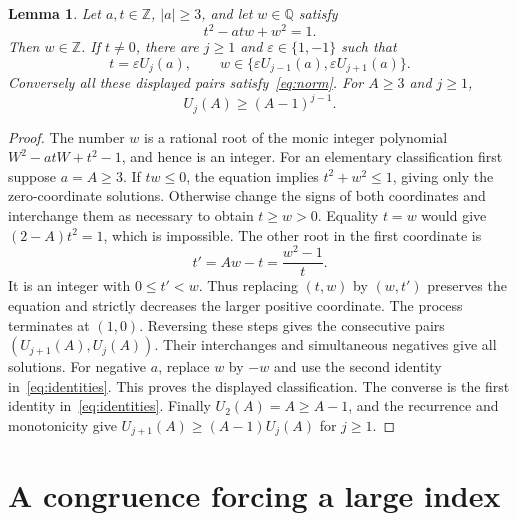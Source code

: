 \documentclass[11pt,a4paper]{article}
\newtheorem{lemma}[theorem]{Lemma}
\newcommand{\Q}{\mathbb Q}\newcommand{\Z}{\mathbb Z}
\begin{document}
\begin{lemma}\label{lem:classification}
Let $a,t\in\Z$, $|a|\ge3$, and let $w\in\Q$ satisfy
\begin{equation}\label{eq:norm}
                         t^2-atw+w^2=1.
\end{equation}
Then $w\in\Z$. If $t\ne0$, there are $j\ge1$ and
$\varepsilon\in\{1,-1\}$ such that
\[
 t=\varepsilon U_j(a),\qquad
 w\in\{\varepsilon U_{j-1}(a),\varepsilon U_{j+1}(a)\}.
\]
Conversely all these displayed pairs satisfy~\eqref{eq:norm}.
For $A\ge3$ and $j\ge1$,
\begin{equation}\label{eq:elementary-growth}
                              U_j(A)\ge(A-1)^{j-1}.
\end{equation}
\end{lemma}
\begin{proof}
The number $w$ is a rational root of the monic integer polynomial
$W^2-atW+t^2-1$, and hence is an integer. For an elementary
classification first suppose $a=A\ge3$. If $tw\le0$, the equation
implies $t^2+w^2\le1$, giving only the zero-coordinate solutions.
Otherwise change the signs of both coordinates and interchange them
as necessary to obtain $t\ge w>0$. Equality $t=w$ would give
$(2-A)t^2=1$, which is impossible. The other root in the first
coordinate is
\[
                    t'=Aw-t=\frac{w^2-1}{t}.
\]
It is an integer with $0\le t'<w$. Thus replacing $(t,w)$ by
$(w,t')$ preserves the equation and strictly decreases the larger
positive coordinate. The process terminates at $(1,0)$. Reversing
these steps gives the consecutive pairs $(U_{j+1}(A),U_j(A))$.
Their interchanges and simultaneous negatives give all solutions.
For negative $a$, replace $w$ by $-w$ and use the second identity
in~\eqref{eq:identities}. This proves the displayed classification.
The converse is the first identity in~\eqref{eq:identities}.
Finally $U_2(A)=A\ge A-1$, and the recurrence and monotonicity give
$U_{j+1}(A)\ge(A-1)U_j(A)$ for $j\ge1$.
\end{proof}

\section{A congruence forcing a large index}
\end{document}
